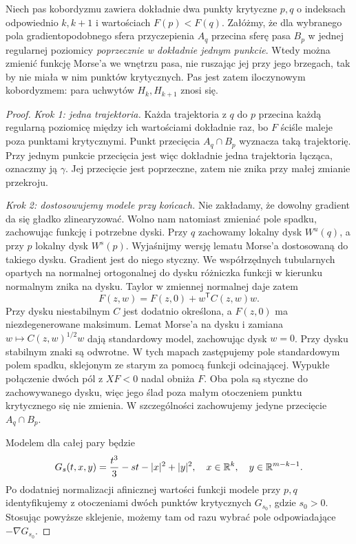 \begin{twierdzenie}
\label{thm:zniesienie-18}
Niech pas kobordyzmu zawiera dokładnie
dwa punkty krytyczne $p,q$ o indeksach
odpowiednio $k,k+1$ i wartościach
$F(p)<F(q)$. Załóżmy, że dla wybranego
pola gradientopodobnego sfera przyczepienia
$A_q$ przecina sferę pasa $B_p$ w jednej
regularnej poziomicy \emph{poprzecznie
w dokładnie jednym punkcie}.
Wtedy można zmienić funkcję Morse'a
we wnętrzu pasa, nie ruszając jej przy
jego brzegach, tak by nie miała w nim
punktów krytycznych. Pas jest zatem
iloczynowym kobordyzmem: para uchwytów
$H_k,H_{k+1}$ znosi się.
\end{twierdzenie}
\begin{proof}
\emph{Krok 1: jedna trajektoria.}
Każda trajektoria z $q$ do $p$ przecina
każdą regularną poziomicę między ich
wartościami dokładnie raz, bo $F$
ściśle maleje poza punktami krytycznymi.
Punkt przecięcia $A_q\cap B_p$ wyznacza
taką trajektorię. Przy jednym punkcie
przecięcia jest więc dokładnie jedna
trajektoria łącząca, oznaczmy ją $\gamma$.
Jej przecięcie jest poprzeczne, zatem
nie znika przy małej zmianie przekroju.

\emph{Krok 2: dostosowujemy modele przy końcach.}
Nie zakładamy, że dowolny gradient da się gładko
zlinearyzować. Wolno nam natomiast zmieniać pole
spadku, zachowując funkcję i potrzebne dyski.
Przy $q$ zachowamy lokalny dysk $W^u(q)$,
a przy $p$ lokalny dysk $W^s(p)$.
Wyjaśnijmy wersję lematu Morse'a dostosowaną do takiego dysku.
Gradient jest do niego styczny. We współrzędnych
tubularnych opartych na normalnej ortogonalnej do dysku
różniczka funkcji w kierunku normalnym znika na dysku.
Taylor w zmiennej normalnej daje zatem
\[
 F(z,w)=F(z,0)+w^{\mathsf T}C(z,w)w.
\]
Przy dysku niestabilnym $C$ jest dodatnio określona,
a $F(z,0)$ ma niezdegenerowane maksimum.
Lemat Morse'a na dysku i zamiana $w\mapsto C(z,w)^{1/2}w$
dają standardowy model, zachowując dysk $w=0$.
Przy dysku stabilnym znaki są odwrotne.
W tych mapach zastępujemy pole standardowym polem
spadku, sklejonym ze starym za pomocą funkcji odcinającej.
Wypukłe połączenie dwóch pól z $XF<0$ nadal obniża $F$.
Oba pola są styczne do zachowywanego dysku, więc jego
ślad poza małym otoczeniem punktu krytycznego się nie zmienia.
W szczególności zachowujemy jedyne przecięcie $A_q\cap B_p$.

Modelem dla całej pary będzie
\begin{equation}\label{eq:narodziny-uchwytow-18}
 G_s(t,x,y)=\frac{t^3}{3}-st-|x|^2+|y|^2,
 \quad x\in\mathbb{R}^k,\quad y\in\mathbb{R}^{m-k-1}.
\end{equation}
Po dodatniej normalizacji afinicznej wartości funkcji
modele przy $p,q$ identyfikujemy z otoczeniami dwóch
punktów krytycznych $G_{s_0}$, gdzie $s_0>0$.
Stosując powyższe sklejenie, możemy tam od razu
wybrać pole odpowiadające $-\nabla G_{s_0}$.


\end{proof}
